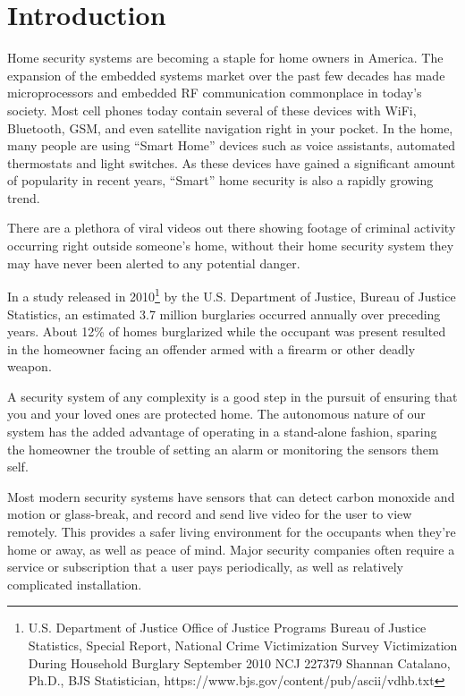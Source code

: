 \documentclass[a4paper,11pt]{report}
\begin{document}
	\section{Introduction}
	\par Home security systems are becoming a staple for home owners in America. The expansion of the embedded systems market over the past few decades has made microprocessors and embedded RF communication commonplace in today's society. Most cell phones today contain several of these devices with WiFi, Bluetooth, GSM, and even satellite navigation right in your pocket. In the home, many people are using “Smart Home” devices such as voice assistants, automated thermostats and light switches. As these devices have gained a significant amount of popularity in recent years, “Smart” home security is also a rapidly growing trend. 
	\par There are a plethora of viral videos out there showing footage of criminal activity occurring right outside someone's home, without their home security system they may have never been alerted to any potential danger. 
	\par In a study released in 2010\footnote{
		U.S. Department of Justice
		Office of Justice Programs
		Bureau of Justice Statistics, Special Report, National Crime Victimization Survey
		Victimization During Household Burglary
		September 2010   NCJ 227379
		Shannan Catalano, Ph.D., 
		BJS Statistician,
		https://www.bjs.gov/content/pub/ascii/vdhb.txt
	} by the U.S. Department of Justice, Bureau of Justice Statistics, an estimated 3.7 million burglaries occurred annually over preceding years. About 12\% of homes burglarized while the occupant was present resulted in the homeowner facing an offender armed with a firearm or other deadly weapon. 
	\par A security system of any complexity is a good step in the pursuit of ensuring that you and your loved ones are protected home. The autonomous nature of our system has the added advantage of operating in a stand-alone fashion, sparing the homeowner the trouble of setting an alarm or monitoring the sensors them self. 
	\par Most modern security systems have sensors that can detect carbon monoxide and motion or glass-break, and record and send live video for the user to view remotely. This provides a safer living environment for the occupants when they’re home or away, as well as peace of mind. Major security companies often require a service or subscription that a user pays periodically, as well as relatively complicated installation.  
\end{document}
